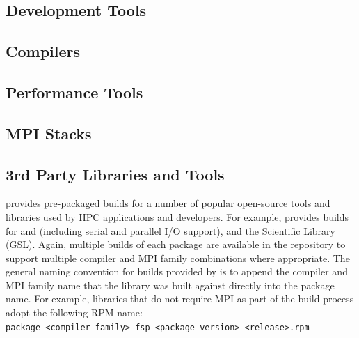 \documentclass[letterpaper]{article}
\newcommand{\install}{yum -y install}
\begin{document}
\subsection{Development Tools} \label{sec:install_dev_tools}


\subsection{Compilers} \label{sec:install_compilers}


\subsection{Performance Tools} \label{sec:install_perf_tools}


\subsection{MPI Stacks} \label{sec:mpi}



\subsection{3rd Party Libraries and Tools} \label{sec:3rdparty}

\FSP{} provides pre-packaged builds for a number of popular open-source
tools and libraries used by HPC applications and developers. For
example, \FSP{} provides builds for \FFTW{} and \hdffive{} (including serial and parallel
I/O support), and the \GNU{} Scientific Library (GSL). Again, multiple builds of
each package are available in the \FSP{} repository to support multiple compiler
and MPI family combinations where appropriate. The general naming convention
for builds provided by \FSP{} is to append the compiler and MPI family name that
the library was built against directly into the package name. For example,
libraries that do not require MPI as part of the build process adopt the
following RPM name: \\

\noindent
\texttt{package-<compiler\_family>-fsp-<package\_version>-<release>.rpm} \\
\end{document}
